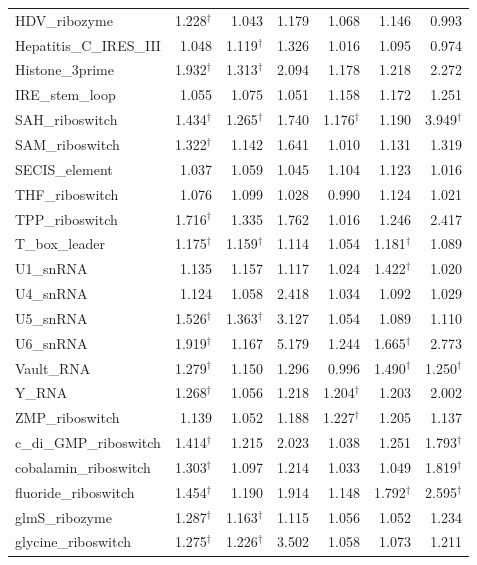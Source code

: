 \documentclass[11pt]{article}
\begin{document}
\begin{longtable}{@{}lrrrrrr@{}}
HDV\_ribozyme & 1.228$^\dagger$ & 1.043 & 1.179 & 1.068 & 1.146 & 0.993 \\
Hepatitis\_C\_IRES\_III & 1.048 & 1.119$^\dagger$ & 1.326 & 1.016 & 1.095 & 0.974 \\
Histone\_3prime & 1.932$^\dagger$ & 1.313$^\dagger$ & 2.094 & 1.178 & 1.218 & 2.272 \\
IRE\_stem\_loop & 1.055 & 1.075 & 1.051 & 1.158 & 1.172 & 1.251 \\
SAH\_riboswitch & 1.434$^\dagger$ & 1.265$^\dagger$ & 1.740 & 1.176$^\dagger$ & 1.190 & 3.949$^\dagger$ \\
SAM\_riboswitch & 1.322$^\dagger$ & 1.142 & 1.641 & 1.010 & 1.131 & 1.319 \\
SECIS\_element & 1.037 & 1.059 & 1.045 & 1.104 & 1.123 & 1.016 \\
THF\_riboswitch & 1.076 & 1.099 & 1.028 & 0.990 & 1.124 & 1.021 \\
TPP\_riboswitch & 1.716$^\dagger$ & 1.335 & 1.762 & 1.016 & 1.246 & 2.417 \\
T\_box\_leader & 1.175$^\dagger$ & 1.159$^\dagger$ & 1.114 & 1.054 & 1.181$^\dagger$ & 1.089 \\
U1\_snRNA & 1.135 & 1.157 & 1.117 & 1.024 & 1.422$^\dagger$ & 1.020 \\
U4\_snRNA & 1.124 & 1.058 & 2.418 & 1.034 & 1.092 & 1.029 \\
U5\_snRNA & 1.526$^\dagger$ & 1.363$^\dagger$ & 3.127 & 1.054 & 1.089 & 1.110 \\
U6\_snRNA & 1.919$^\dagger$ & 1.167 & 5.179 & 1.244 & 1.665$^\dagger$ & 2.773 \\
Vault\_RNA & 1.279$^\dagger$ & 1.150 & 1.296 & 0.996 & 1.490$^\dagger$ & 1.250$^\dagger$ \\
Y\_RNA & 1.268$^\dagger$ & 1.056 & 1.218 & 1.204$^\dagger$ & 1.203 & 2.002 \\
ZMP\_riboswitch & 1.139 & 1.052 & 1.188 & 1.227$^\dagger$ & 1.205 & 1.137 \\
c\_di\_GMP\_riboswitch & 1.414$^\dagger$ & 1.215 & 2.023 & 1.038 & 1.251 & 1.793$^\dagger$ \\
cobalamin\_riboswitch & 1.303$^\dagger$ & 1.097 & 1.214 & 1.033 & 1.049 & 1.819$^\dagger$ \\
fluoride\_riboswitch & 1.454$^\dagger$ & 1.190 & 1.914 & 1.148 & 1.792$^\dagger$ & 2.595$^\dagger$ \\
glmS\_ribozyme & 1.287$^\dagger$ & 1.163$^\dagger$ & 1.115 & 1.056 & 1.052 & 1.234 \\
glycine\_riboswitch & 1.275$^\dagger$ & 1.226$^\dagger$ & 3.502 & 1.058 & 1.073 & 1.211 \\

\end{longtable}
\end{document}
